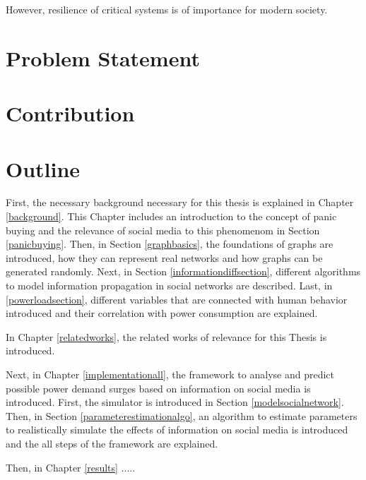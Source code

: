 However, resilience of critical systems is of importance for modern society.



\section{Problem Statement}
\label{problemstatement}
\section{Contribution}
\label{contribution}
\section{Outline}
\label{outline}

First, the necessary background necessary for this thesis is explained
in Chapter \ref{background}. This Chapter includes an introduction
to the concept of panic buying and the relevance of social media 
to this phenomenom in Section \ref{panicbuying}. Then, in 
Section \ref{graphbasics}, the foundations of graphs are introduced,
how they can represent real networks and how graphs can be
generated randomly. Next, in Section \ref{informationdiffsection},
different algorithms to model information propagation in 
social networks are described. Last, in \ref{powerloadsection},
different variables that are connected with human behavior
introduced and their correlation with power consumption are 
explained.

In Chapter \ref{relatedworks}, the related works of relevance for 
this Thesis is introduced.

Next, in Chapter \ref{implementationall}, the framework to
analyse and predict possible power demand surges based on
information on social media is introduced.
First, the simulator is introduced in Section \ref{modelsocialnetwork}.
Then, in Section \ref{parameterestimationalgo}, 
an algorithm to estimate parameters to realistically simulate
the effects of information on social media is introduced and 
the all steps of the framework are explained.

Then, in Chapter \ref{results} .....